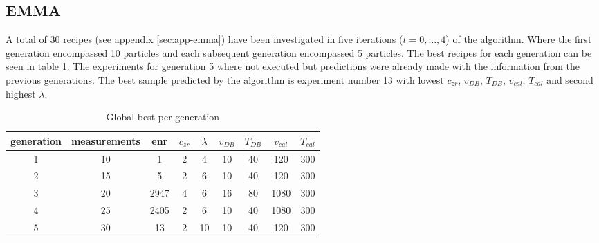 \subsection{EMMA}
\label{sec:res-emma}
A total of 30 recipes (see appendix \ref{sec:app-emma}) have been investigated in 
five iterations ($t = 0, \dots, 4$) of the algorithm. 
Where the first generation encompassed 10 particles and each subsequent generation encompassed 5 particles. 
The best recipes for each generation can be seen in table \ref{tab:emma-Gb}. 
The experiments for generation 5 where not executed but 
predictions were already made
with the information from the previous generations. 
The best sample predicted by the algorithm is experiment number 13 with 
lowest $c_{zr}$, $v_{DB}$, $T_{DB}$, $v_{cal}$, $T_{cal}$ and second highest $\lambda$. 

\begin{table}[htb]
	\centering
    \caption{Global best per generation}
	\label{tab:emma-Gb}
	\begin{tabular}{ccccccccc}
        \hline\hline
		generation& measurements &enr &$c_{zr}$ &$\lambda$ &$v_{DB}$ &$T_{DB}$ &$v_{cal}$ &$T_{cal}$\\
        \hline
	1  &10	&1       &2    &4   &10   &40  &120  &300\\
	2  &15	&5       &2    &6   &10   &40  &120  &300\\
	3  &20	&2947    &4    &6   &16   &80 &1080  &300\\
	4  &25	&2405    &2    &6   &10   &40 &1080  &300\\
	5  &30	&13      &2   &10   &10   &40  &120  &300\\
    \hline\hline
	\end{tabular}
\end{table}

